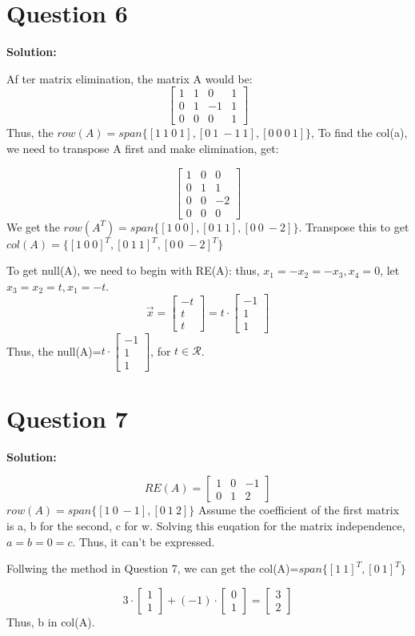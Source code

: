 \documentclass[11pt]{article} %
\begin{document}
\section{Question 6}

\textbf{Solution:}

Af ter matrix elimination, the matrix A would be:
$$\begin{bmatrix}
	1&1&0&1\\
	0&1&-1&1\\
	0&0&0&1
\end{bmatrix}$$
Thus, the $row(A)=span\{[1 \ 1 \ 0 \ 1],[0 \ 1\  -1 \ 1],[0 \ 0 \ 0 \ 1] \}$,  
To find the col(a), we need to transpose A first and make elimination, get:

$$\begin{bmatrix}
	1&0&0\\
	0&1&1\\
	0&0&-2\\
	0&0&0
\end{bmatrix}$$
We get the $row(A^T)=span\{[1\ 0\ 0],[0\ 1\ 1],[0\ 0\ -2]\}$. Transpose this to get $col(A)=\{
[1\ 0\ 0]^T,[0\ 1\ 1]^T,[0\ 0\ -2]^T\}$

To get null(A), we need to begin with RE(A):
thus, $x_1=-x_2=-x_3, x_4=0$, let $x_3=x_2=t, x_1=-t$.
$$\vec{x}=\begin{bmatrix}
	-t\\
	t\\
	t
\end{bmatrix}=t\cdot \begin{bmatrix}
-1\\
1\\
1
\end{bmatrix}$$
Thus, the null(A)=$ t \cdot \begin{bmatrix}
	-1\\
	1\\
	1
\end{bmatrix}$, for $t\in \mathcal{R}$.

\section{Question 7}
\textbf{Solution:}

$$RE(A)=\begin{bmatrix}
	1&0&-1\\0&1&2
\end{bmatrix}$$
$row(A)=span\{[1\ 0\ -1],[0\ 1\ 2]\}$
Assume the coefficient of the first matrix is a, b for the second, c for w. Solving this euqation for the matrix independence, $a=b=0=c$. Thus, it can't be expressed. 

Follwing the method in Question 7, we can get the col(A)=$span\{[1\ 1]^T,[0 \ 1]^T\}$

$$3\cdot \begin{bmatrix}
	1\\
	1
\end{bmatrix}+(-1)\cdot \begin{bmatrix}
0\\1
\end{bmatrix}=\begin{bmatrix}
3\\2
\end{bmatrix}$$
Thus, b in col(A).
\end{document}
